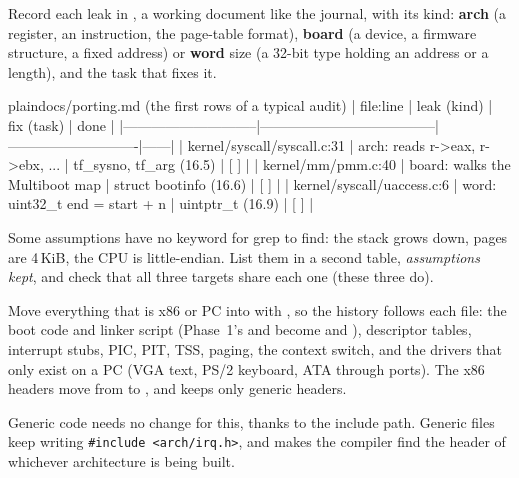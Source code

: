 \documentclass[11pt,a4paper]{article}
\begin{document}
Record each leak in , a working document like the journal, with its kind: \textbf{arch} (a
register, an instruction, the page-table format), \textbf{board} (a device, a firmware structure, a fixed address) or
\textbf{word} size (a 32-bit type holding an address or a length), and the task that fixes it.

\begin{lst}{plain}{docs/porting.md (the first rows of a typical audit)}
| file:line                   | leak (kind)                          | fix (task)                 | done |
|-----------------------------|--------------------------------------|----------------------------|------|
| kernel/syscall/syscall.c:31 | arch: reads r->eax, r->ebx, ...      | tf_sysno, tf_arg (16.5)    | [ ]  |
| kernel/mm/pmm.c:40          | board: walks the Multiboot map       | struct bootinfo (16.6)     | [ ]  |
| kernel/syscall/uaccess.c:6  | word: uint32_t end = start + n       | uintptr_t (16.9)           | [ ]  |
\end{lst}

Some assumptions have no keyword for grep to find: the stack grows down, pages are 4\,KiB, the CPU is little-endian.
List them in a second table, \emph{assumptions kept}, and check that all three targets share each one (these three do).

Move everything that is x86 or PC into  with , so the history follows each file:
the boot code and linker script (Phase~1's  and  become  and
), descriptor tables, interrupt stubs, PIC, PIT, TSS, paging, the context switch, and the drivers that
only exist on a PC (VGA text, PS/2 keyboard, ATA through ports). The x86 headers move from  to
, and  keeps only generic headers.

Generic code needs no change for this, thanks to the include path. Generic files keep writing
\texttt{\#include <arch/irq.h>}, and  makes the compiler find
the header of whichever architecture is being built.
\end{document}
